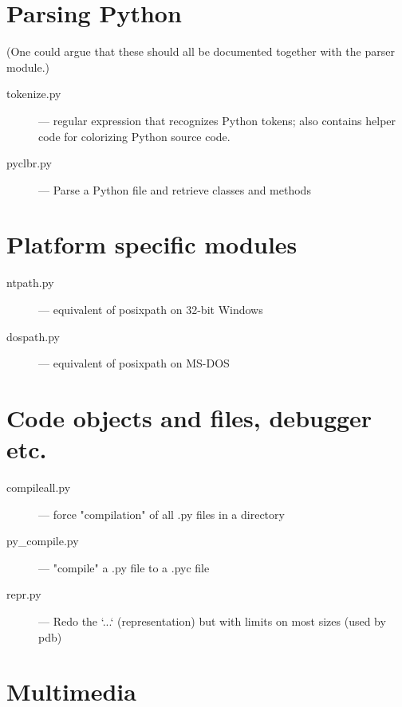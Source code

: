\section{Parsing Python}

(One could argue that these should all be documented together with the
parser module.)

\begin{description}
\item[tokenize.py]
--- regular expression that recognizes Python tokens; also
contains helper code for colorizing Python source code.

\item[pyclbr.py]
--- Parse a Python file and retrieve classes and methods
\end{description}


\section{Platform specific modules}

\begin{description}
\item[ntpath.py]
--- equivalent of posixpath on 32-bit Windows

\item[dospath.py]
--- equivalent of posixpath on MS-DOS
\end{description}


\section{Code objects and files, debugger etc.}

\begin{description}
\item[compileall.py]
--- force "compilation" of all .py files in a directory

\item[py_compile.py]
--- "compile" a .py file to a .pyc file

\item[repr.py]
--- Redo the `...` (representation) but with limits on most
sizes (used by pdb)
\end{description}


\section{Multimedia}

